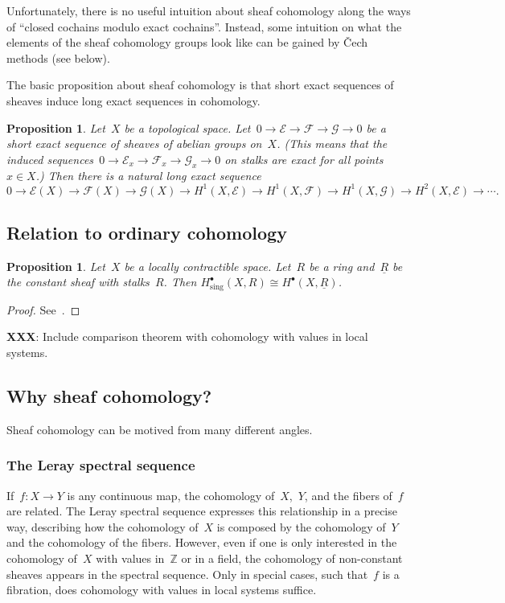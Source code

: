 \documentclass[10pt]{amsart}
\theoremstyle{definition}
\theoremstyle{plain}
\newtheorem{prop}[defn]{Proposition}
\theoremstyle{remark}
\newcommand{\E}{\mathcal{E}}
\newcommand{\F}{\mathcal{F}}
\newcommand{\G}{\mathcal{G}}
\newcommand{\Z}{\mathbb{Z}}
\begin{document}
Unfortunately, there is no useful intuition about sheaf cohomology along the
ways of ``closed cochains modulo exact cochains''. Instead, some intuition on
what the elements of the sheaf cohomology groups look like can be gained by
Čech methods (see below).

The basic proposition about sheaf cohomology is that short exact sequences of
sheaves induce long exact sequences in cohomology.

\begin{prop}Let~$X$ be a topological space. Let~$0 \to \E \to \F \to \G \to 0$
be a short exact sequence of sheaves of abelian groups on~$X$. (This means that
the induced sequences~$0 \to \E_x \to \F_x \to \G_x \to 0$ on stalks are exact
for all points~$x \in X$.) Then there is a natural long exact sequence
\[ 0 \to \E(X) \to \F(X) \to \G(X) \to
  H^1(X,\E) \to H^1(X,\F) \to H^1(X,\G) \to H^2(X,\E) \to \cdots. \]
\end{prop}


\subsection{Relation to ordinary cohomology}

\begin{prop}Let~$X$ be a locally contractible space. Let~$R$ be a ring
and~$\underline{R}$ be the constant sheaf with stalks~$R$. Then
$H^\bullet_\text{sing}(X, R) \cong H^\bullet(X, \underline{R})$.
\end{prop}
\begin{proof}See~\cite{cibotaru}.
\end{proof}

\textbf{XXX}: Include comparison theorem with cohomology with values in local
systems.


\subsection{Why sheaf cohomology?}

Sheaf cohomology can be motived from many different angles.

\subsubsection*{The Leray spectral sequence} If~$f : X \to Y$ is any continuous map,
the cohomology of~$X$,~$Y$, and the fibers of~$f$ are related. The
Leray spectral sequence expresses this relationship in a precise way,
describing how the cohomology of~$X$ is composed by the cohomology of~$Y$ and
the cohomology of the fibers. However, even if one is only interested in the
cohomology of~$X$ with values in~$\Z$ or in a field, the cohomology of
non-constant sheaves appears in the spectral sequence. Only in special cases,
such that~$f$ is a fibration, does cohomology with values in local systems suffice.
\end{document}

